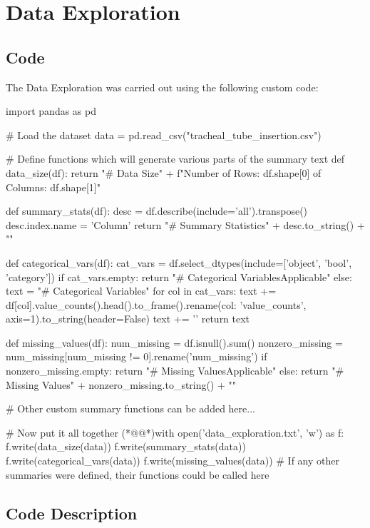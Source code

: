 \documentclass[11pt]{article}
\begin{document}
\section{Data Exploration}
\subsection{{Code}}
The Data Exploration was carried out using the following custom code:

\begin{python}


import pandas as pd

# Load the dataset
data = pd.read_csv("tracheal_tube_insertion.csv")

# Define functions which will generate various parts of the summary text
def data_size(df):
    return "# Data Size\n" + f"Number of Rows: {df.shape[0]} \nNumber of Columns: {df.shape[1]}\n"

def summary_stats(df):
    desc = df.describe(include='all').transpose()
    desc.index.name = 'Column'
    return "# Summary Statistics\n" + desc.to_string() + "\n"

def categorical_vars(df):
    cat_vars = df.select_dtypes(include=['object', 'bool', 'category'])
    if cat_vars.empty:
        return "# Categorical Variables\nNot Applicable\n"
    else:
        text = "# Categorical Variables\n"
        for col in cat_vars:
            text += df[col].value_counts().head().to_frame().rename({col: 'value_counts'}, axis=1).to_string(header=False)
            text += '\n'
        return text

def missing_values(df):
    num_missing = df.isnull().sum()
    nonzero_missing = num_missing[num_missing != 0].rename('num_missing')
    if nonzero_missing.empty:
        return "# Missing Values\nNot Applicable\n"
    else:
        return "# Missing Values\n" + nonzero_missing.to_string() + "\n"

# Other custom summary functions can be added here...

# Now put it all together
(*@@*)with open('data_exploration.txt', 'w') as f:
    f.write(data_size(data))
    f.write(summary_stats(data))
    f.write(categorical_vars(data))
    f.write(missing_values(data))
    # If any other summaries were defined, their functions could be called here

\end{python}

\subsection{Code Description}
\end{document}
